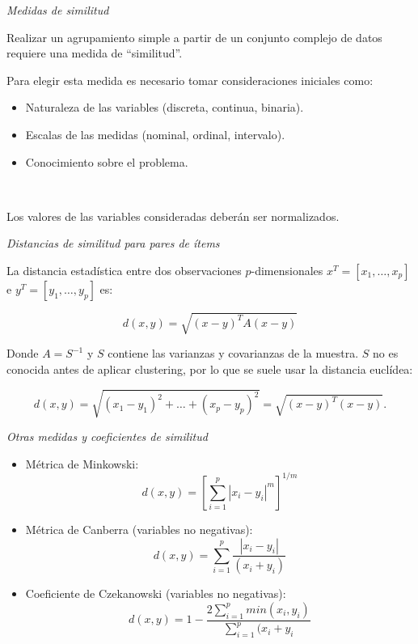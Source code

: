 \documentclass[spanish]{beamer}
\begin{document}
\begin{frame}{\textit{Medidas de similitud}}

Realizar un agrupamiento simple a partir de un conjunto complejo de datos requiere una medida de ``similitud''.\break

Para elegir esta medida es necesario tomar consideraciones iniciales como:

\begin{itemize}
\item Naturaleza de las variables (discreta, continua, binaria).
\item Escalas de las medidas (nominal, ordinal, intervalo).
\item Conocimiento sobre el problema.
\end{itemize}\

Los valores de las variables consideradas deberán ser normalizados.
\end{frame}

\begin{frame}{\textit{Distancias de similitud para pares de ítems}}

La distancia estadística entre dos observaciones $p$-dimensionales $x^T = [x_1,\dots,x_p]$ e $y^T=[y_1,\dots,y_p]$ es:

$$d(x,y)=\sqrt{(x-y)^TA(x-y)} $$

Donde $A=S^{-1}$ y $S$ contiene las varianzas y covarianzas de la muestra.
$S$ no es conocida antes de aplicar clustering, por lo que se suele usar la distancia euclídea:

$$d(x,y) = \sqrt{(x_1-y_1)^2+\dots+(x_p-y_p)^2}=\sqrt{(x-y)^T(x-y)}.$$
\end{frame}

\begin{frame}{\textit{Otras medidas y coeficientes de similitud}}

\begin{itemize}
\item Métrica de Minkowski:
$$ d(x,y)=\left  [\sum_{i=1}^{p}{|x_i-y_i|^m} \right ]^{1/m}$$
\item Métrica de Canberra (variables no negativas):
$$d(x,y)=\sum_{i=1}^{p}{\frac{|x_i-y_i|}{(x_i+y_i)}}$$
\item Coeficiente de Czekanowski (variables no negativas):
$$d(x,y)=1-\frac{2\sum_{i=1}^{p}{min(x_i,y_i)}}{\sum_{i=1}^{p}{(x_i+y_i}}$$
\end{itemize}
\end{frame}
\end{document}
